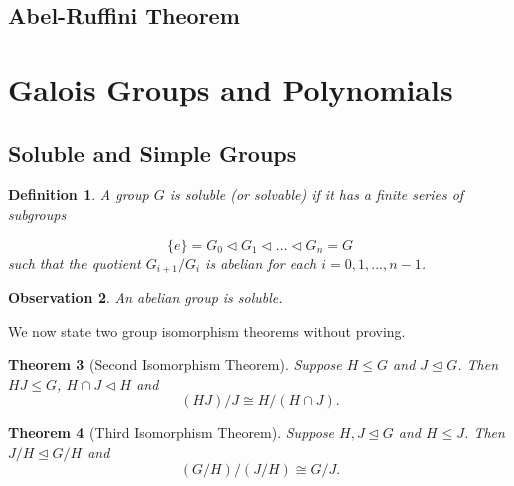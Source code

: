\documentclass[12pt]{article}
\newtheorem{theorem}{Theorem}
\newtheorem{definition}[theorem]{Definition}
\newtheorem{observation}[theorem]{\textbf{Observation}}
\begin{document}
\subsection{Abel-Ruffini Theorem}
\section{Galois Groups and Polynomials}

\subsection{Soluble and Simple Groups}

\begin{definition} \label{def:soluble}
    A group $G$ is soluble (or solvable) if it has a finite series of subgroups

    $$ \{ e \} = G_0 \triangleleft G_1 \triangleleft \dots \triangleleft G_n =
        G$$
    such that the quotient $G_{i+1} / G_{i}$ is abelian for each $i = 0, 1,
        ...,  n - 1$.
\end{definition}

\begin{observation}
    An abelian group is soluble.
\end{observation}

We now state two group isomorphism theorems without proving.

\begin{theorem}[Second Isomorphism Theorem] \label{thm:second-iso}
    Suppose $H \le G$ and $J \trianglelefteq G$. Then $HJ \le G$, $H \cap J
        \triangleleft H$ and $$
        (HJ) / J \cong H / (H \cap J).
    $$
\end{theorem}
\begin{theorem}[Third Isomorphism Theorem] \label{thm:third-iso}
    Suppose $H, J \trianglelefteq G$ and $H \le J$. Then $J/H \trianglelefteq
        G/H$ and $$
        (G/H)/(J/H) \cong G / J.	$$
\end{theorem}
\end{document}
